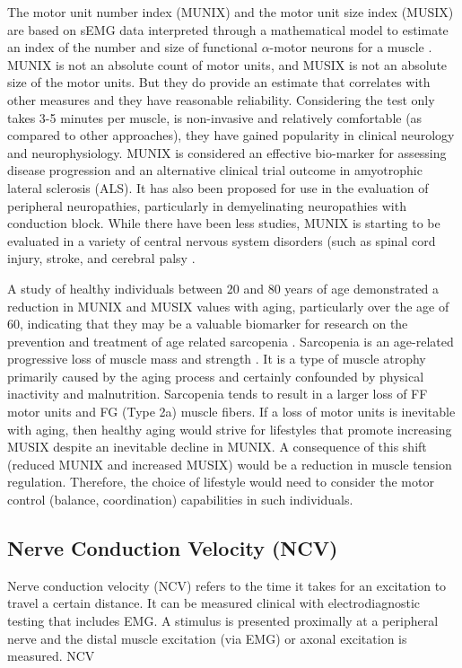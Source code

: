 The motor unit number index (MUNIX) and the motor unit size index (MUSIX) are based on sEMG data interpreted through a mathematical model to estimate an index of the number and size of functional $\alpha$-motor neurons for a muscle \cite{nandedkar_motor_2004}. MUNIX is not an absolute count of motor units, and MUSIX is not an absolute size of the motor units. But they do provide an estimate that correlates with other measures and they have reasonable reliability. Considering the test only takes 3-5 minutes per muscle, is non-invasive and relatively comfortable (as compared to other approaches), they have gained popularity in clinical neurology and neurophysiology. MUNIX is considered an effective bio-marker for assessing disease progression and an alternative clinical trial outcome in amyotrophic lateral sclerosis (ALS). It has also been proposed for use in the evaluation of peripheral neuropathies, particularly in demyelinating neuropathies with conduction block. While there have been less studies, MUNIX is starting to be evaluated in a variety of central nervous system disorders (such as spinal cord injury, stroke, and cerebral palsy \cite{fatehi_utility_2018}. 

A study of healthy individuals between 20 and 80 years of age demonstrated a reduction in MUNIX and MUSIX values with aging, particularly over the age of 60, indicating that they may be a valuable biomarker for research on the prevention and treatment of age related sarcopenia \cite{cao_reference_2020}. Sarcopenia is an age-related progressive loss of muscle mass and strength \cite{dao_sarcopenia_2020}. It is a type of muscle atrophy primarily caused by the aging process and certainly confounded by physical inactivity and malnutrition. Sarcopenia tends to result in a larger loss of FF motor units and FG (Type 2a) muscle fibers. If a loss of motor units is inevitable with aging, then healthy aging would strive for lifestyles that promote increasing MUSIX despite an inevitable decline in MUNIX. A consequence of this shift (reduced MUNIX and increased MUSIX) would be a reduction in muscle tension regulation. Therefore, the choice of lifestyle would need to consider the motor control (balance, coordination) capabilities in such individuals.

\subsection{Nerve Conduction Velocity (NCV)}

Nerve conduction velocity (NCV) refers to the time it takes for an excitation to travel a certain distance. It can be measured clinical with electrodiagnostic testing that includes EMG. A stimulus is presented proximally at a peripheral nerve and the distal muscle excitation (via EMG) or axonal excitation is measured. NCV

